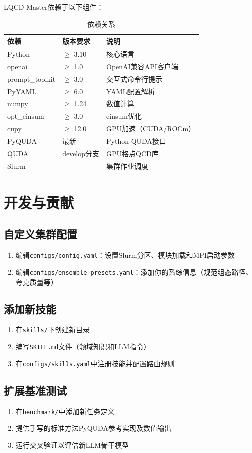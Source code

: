\documentclass[12pt,a4paper]{ctexart}
\begin{document}
LQCD Master依赖于以下组件：

\begin{table}[H]
\centering
\caption{依赖关系}
\label{tab:deps}
\begin{tabular}{@{}lll@{}}
\toprule
\textbf{依赖} & \textbf{版本要求} & \textbf{说明} \\
\midrule
Python & $\ge$ 3.10 & 核心语言 \\
openai & $\ge$ 1.0 & OpenAI兼容API客户端 \\
prompt\_toolkit & $\ge$ 3.0 & 交互式命令行提示 \\
PyYAML & $\ge$ 6.0 & YAML配置解析 \\
numpy & $\ge$ 1.24 & 数值计算 \\
opt\_einsum & $\ge$ 3.0 & einsum优化 \\
cupy & $\ge$ 12.0 & GPU加速（CUDA/ROCm） \\
PyQUDA & 最新 & Python-QUDA接口 \\
QUDA & develop分支 & GPU格点QCD库 \\
Slurm & — & 集群作业调度 \\
\bottomrule
\end{tabular}
\end{table}

\section{开发与贡献}

\subsection{自定义集群配置}

\begin{enumerate}[leftmargin=*]
    \item 编辑\texttt{configs/config.yaml}：设置Slurm分区、模块加载和MPI启动参数
    \item 编辑\texttt{configs/ensemble\_presets.yaml}：添加你的系综信息（规范组态路径、夸克质量等）
\end{enumerate}

\subsection{添加新技能}

\begin{enumerate}[leftmargin=*]
    \item 在\texttt{skills/}下创建新目录
    \item 编写\texttt{SKILL.md}文件（领域知识和LLM指令）
    \item 在\texttt{configs/skills.yaml}中注册技能并配置路由规则
\end{enumerate}

\subsection{扩展基准测试}

\begin{enumerate}[leftmargin=*]
    \item 在\texttt{benchmark/}中添加新任务定义
    \item 提供手写的标准方法PyQUDA参考实现及数值输出
    \item 运行交叉验证以评估新LLM骨干模型
\end{enumerate}
\end{document}
